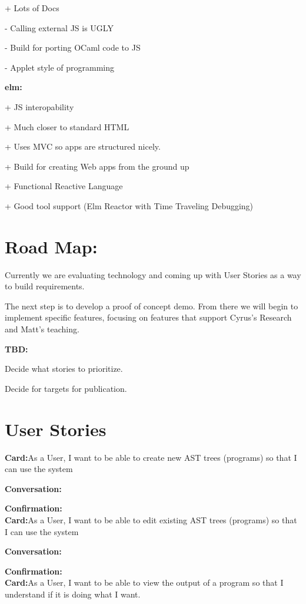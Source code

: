 \documentclass{sig-alternate-05-2015}
\begin{document}
+ Lots of Docs

- Calling external JS is UGLY

- Build for porting OCaml code to JS

- Applet style of programming



\textbf{elm:}

+ JS interopability

+ Much closer to standard HTML

+ Uses MVC so apps are structured nicely.

+ Build for creating Web apps from the ground up

+ Functional Reactive Language

+ Good tool support (Elm Reactor with Time Traveling Debugging)


\section{Road Map:}
Currently we are evaluating technology and coming up with User Stories as a way to build requirements.  

The next step is to develop a proof of concept demo.
From there we will begin to implement specific features, focusing on features that support Cyrus's Research and Matt's teaching.


\textbf{TBD:} 

Decide what stories to prioritize.

Decide for targets for publication.



\section{User Stories}
\textbf{Card:}As a User, I want to be able to create new AST trees (programs) so that I can use the system

\textbf{Conversation:} 

\textbf{Confirmation:}\\

\textbf{Card:}As a User, I want to be able to edit existing AST trees (programs) so that I can use the system

\textbf{Conversation:} 

\textbf{Confirmation:}\\

\textbf{Card:}As a User, I want to be able to view the output of a program so that I understand if it is doing what I want.
\end{document}
